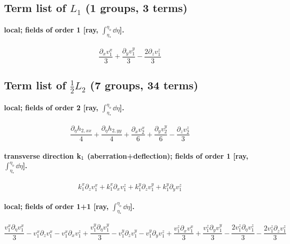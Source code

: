 \subsection*{Term list of $L_1$ (1 groups, 3 terms)}
\paragraph{local; fields of order 1 [ray, $\int_{\eta_*}^{\eta_o}\dd\eta$].}
\begin{dmath*}\frac{\partial_x  {v^{x}_{1}}}{3} + \frac{\partial_y  {v^{y}_{1}}}{3} - \frac{2 \partial_z  {v^{z}_{1}}}{3}\end{dmath*}
\subsection*{Term list of $\tfrac12L_2$ (7 groups, 34 terms)}
\paragraph{local; fields of order 2 [ray, $\int_{\eta_*}^{\eta_o}\dd\eta$].}
\begin{dmath*}\frac{\partial_\eta  h_{2,xx}}{4} + \frac{\partial_\eta  h_{2,yy}}{4} + \frac{\partial_x  {v^{x}_{2}}}{6} + \frac{\partial_y  {v^{y}_{2}}}{6} - \frac{\partial_z  {v^{z}_{2}}}{3}\end{dmath*}
\paragraph{transverse direction $\mathbf k_1$ (aberration+deflection); fields of order 1 [ray, $\int_{\eta_*}^{\eta_o}\dd\eta$].}
\begin{dmath*}{k^{x}_{1}} \partial_z  {v^{x}_{1}} + {k^{x}_{1}} \partial_x  {v^{z}_{1}} + {k^{y}_{1}} \partial_z  {v^{y}_{1}} + {k^{y}_{1}} \partial_y  {v^{z}_{1}}\end{dmath*}
\paragraph{local; fields of order 1{+}1 [ray, $\int_{\eta_*}^{\eta_o}\dd\eta$].}
\begin{dmath*}\frac{{v^{x}_{1}} \partial_\eta  {v^{x}_{1}}}{3} - {v^{x}_{1}} \partial_z  {v^{x}_{1}} - {v^{x}_{1}} \partial_x  {v^{z}_{1}} + \frac{{v^{y}_{1}} \partial_\eta  {v^{y}_{1}}}{3} - {v^{y}_{1}} \partial_z  {v^{y}_{1}} - {v^{y}_{1}} \partial_y  {v^{z}_{1}} + \frac{{v^{z}_{1}} \partial_x  {v^{x}_{1}}}{3} + \frac{{v^{z}_{1}} \partial_y  {v^{y}_{1}}}{3} - \frac{2 {v^{z}_{1}} \partial_\eta  {v^{z}_{1}}}{3} - \frac{2 {v^{z}_{1}} \partial_z  {v^{z}_{1}}}{3}\end{dmath*}
